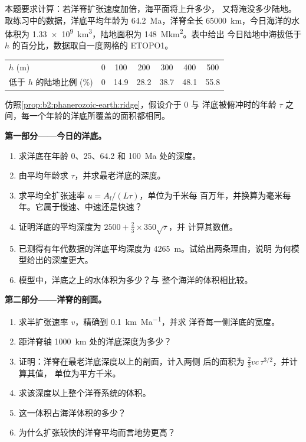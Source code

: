 \begin{problem}\label{pb:b2:phanerozoic-earth:1}
本题要求计算：若洋脊扩张速度加倍，海平面将上升多少，
又将淹没多少陆地。取练习中的数据，洋底平均年龄为
\qty{64.2}{Ma}，洋脊全长 \qty{65000}{km}，今日海洋的水体积为
\qty{1.33e9}{km^3}，陆地面积为 \qty{148}{\mega km^2}。表中给出
今日陆地中海拔低于 $h$ 的百分比，数据取自一度网格的 ETOPO1。
\begin{center}
\small
\begin{tabular}{lcccccc}
\hline
$h$ (\unit{m}) & 0 & 100 & 200 & 300 & 400 & 500 \\
低于 $h$ 的陆地比例 (\unit{\percent}) & 0 & 14.9 & 28.2 & 38.7 & 48.1 & 55.8 \\
\hline
\end{tabular}
\end{center}
仿照\cref{prop:b2:phanerozoic-earth:ridge}，假设介于 0 与
洋底被俯冲时的年龄 $\tau$ 之间，每一个年龄的洋底所覆盖的面积都相同。

\noindent\textbf{第一部分——今日的洋底。}
\begin{enumerate}
  \item 求洋底在年龄 0、25、64.2 和 \qty{100}{Ma} 处的深度。
  \item 由平均年龄求 $\tau$，并求最老洋底的深度。
  \item 求平均全扩张速率 $u = A_{\text{f}}/(L\tau)$，单位为千米每
        百万年，并换算为毫米每年。它属于慢速、中速还是快速？
  \item 证明洋底的平均深度为 $2500 + \tfrac23 \times 350\sqrt\tau$，并
        计算其数值。
  \item 已测得有年代数据的洋底平均深度为 \qty{4265}{m}。试给出两条理由，说明
        为何模型给出的深度更大。
  \item 模型中，洋底之上的水体积为多少？与
        整个海洋的体积相比较。
\end{enumerate}

\noindent\textbf{第二部分——洋脊的剖面。}
\begin{enumerate}[resume]
  \item 求半扩张速率 $v$，精确到 \qty{0.1}{km.Ma^{-1}}，并求
        洋脊每一侧洋底的宽度。
  \item 距洋脊轴 \qty{1000}{km} 处的洋底深度为多少？
  \item 证明：洋脊在最老洋底深度以上的剖面，计入两侧
        后的面积为 $\tfrac23 v c\,\tau^{3/2}$，并计算其值，
        单位为平方千米。
  \item 求该深度以上整个洋脊系统的体积。
  \item 这一体积占海洋体积的多少？
  \item 为什么扩张较快的洋脊平均而言地势更高？
\end{enumerate}


\end{problem}
